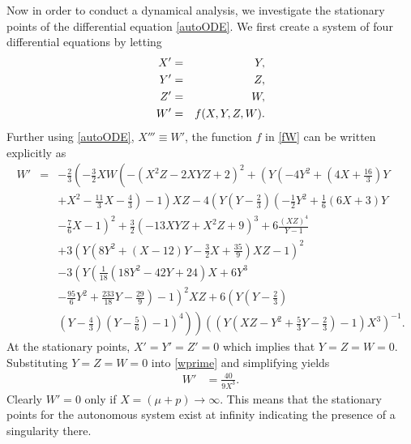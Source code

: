 \documentclass[abstract=on,notitlepage,superscriptaddress,nofootinbib,aps,preprint,prd]{revtex4}
\newcommand{\0}{^{(0)}}
\newcommand{\1}{^{(1)}}
\newcommand{\2}{^{(2)}}
\newcommand{\3}{{}^{(3)}}
\begin{document}
Now in order to conduct a dynamical analysis, we investigate the stationary points of the differential equation \eqref{autoODE}. We first create a system of four differential equations by letting 
\begin{eqnarray}
    X'&=&Y, \notag\\
    Y'&=&Z, \notag\\
    Z'&=&W, \notag\\
    \label{fW}
    W'&=&f(X,Y,Z,W). 
\end{eqnarray}
Further using \eqref{autoODE}, $X''' \equiv W'$, the function $f$ in \eqref{fW} can be written explicitly as
\begin{eqnarray}
    W'  &=& -\frac{2}{3} \left(  -\frac{3}{2}X W   \left( - \left(X^2 Z   -2XYZ   +2 \right) ^{2} + \left( Y  
 \left( -4  Y  ^{2}+ \left( 4X +\frac{16}{3}\right) \right. \right. \right. \right. Y  \nonumber\\
  && \left. \left. +  X ^{2}-\frac{11}{3}X  -\frac{4}{3}\right) -1\right) X  Z  -4 \left( Y   \left( Y  -\frac{2}{3}
 \right)  \left( -\frac{1}{2} Y ^{2}+\frac{1}{6}\left( 6X  +3 \right) Y \right. \right. \nonumber\\
&& \left. -\frac{7}{6}X  -1\right)^{2} +\frac{3}{2} \left( 
-13XYZ +X^2 Z +9 \right)^{3}+6\frac { \left( XZ \right)^{4}}{Y  -1}  \nonumber\\
 &&+3 \left( Y \left( 8 Y ^{2}+ \left( X  -12 \right) Y  -\frac{3}{2}X
 +{\frac {35}{9}} \right) XZ -1 \right) ^{2} \nonumber\\
  &&-3 \left( Y
   \left( \frac{1}{18} \left( 18 Y ^{2}-42Y  +24 \right) X  +6 Y^{3} \right. \right. \nonumber\\
&& \left. \left. -{\frac {95}
{6}} Y ^{2}+\frac {233}{18}Y
  -\frac {29}{9} \right) -1 \right) ^{2}X  Z  +6 \left( Y  
 \left( Y  -\frac{2}{3}\right) \right.  \nonumber\\
 && \left. \left. \left. \left( Y  -\frac{4}{3} \right)  \left( Y  -\frac{5}{6}\right)-1\right)^{4}\right)\right) \left(  \left( Y   \left( X Z  -  Y ^{2}+\frac{5}{3}Y  -\frac{2}{3} \right) -1 \right)X^3\right)^{-1}.\label{wprime}
\end{eqnarray}
At the stationary points, $X'=Y'=Z'=0$ which implies that $Y=Z=W=0$. Substituting $Y=Z=W=0$ into \eqref{wprime} and simplifying yields
\begin{align}
    W' &= \frac{40}{9X^3}.
\end{align}
Clearly $W'=0$ only if $X = (\mu+p) \to \infty$. This means that the stationary points for the autonomous system exist at infinity indicating the presence of a singularity there. 
\end{document}
